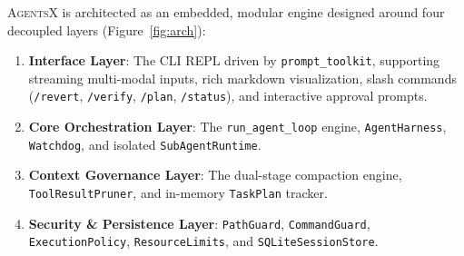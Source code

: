 \documentclass[10pt,twocolumn,letterpaper]{article}
\begin{document}
\textsc{AgentsX} is architected as an embedded, modular engine designed around four decoupled layers (Figure~\ref{fig:arch}):
\begin{enumerate}
    \item \textbf{Interface Layer}: The CLI REPL driven by \texttt{prompt\_toolkit}, supporting streaming multi-modal inputs, rich markdown visualization, slash commands (\texttt{/revert}, \texttt{/verify}, \texttt{/plan}, \texttt{/status}), and interactive approval prompts.
    \item \textbf{Core Orchestration Layer}: The \texttt{run\_agent\_loop} engine, \texttt{AgentHarness}, \texttt{Watchdog}, and isolated \texttt{SubAgentRuntime}.
    \item \textbf{Context Governance Layer}: The dual-stage compaction engine, \texttt{ToolResultPruner}, and in-memory \texttt{TaskPlan} tracker.
    \item \textbf{Security \& Persistence Layer}: \texttt{PathGuard}, \texttt{CommandGuard}, \texttt{ExecutionPolicy}, \texttt{ResourceLimits}, and \texttt{SQLiteSessionStore}.
\end{enumerate}
\end{document}
